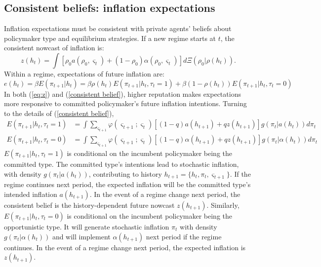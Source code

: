 \documentclass[12pt,letter,leqno]{article}
\theoremstyle{asn}
\theoremstyle{lem}
\theoremstyle{slem}
\theoremstyle{prop}
\theoremstyle{appprop}
\theoremstyle{rem}
\theoremstyle{defn}
\begin{document}
\subsection{Consistent beliefs: inflation expectations}
Inflation expectations must be consistent with private agents' beliefs about policymaker type and equilibrium strategies. If a new regime starts at $t$, the consistent nowcast of inflation is:
\begin{equation}\label{eq:z}
    z(h_t) =\int \left[ \rho_0 a(\rho_0,\varsigma_t) + (1-\rho_0) \alpha(\rho_0,\varsigma_t) \right]d\Xi(\rho_0|\rho(h_t)).
\end{equation}
Within a regime, expectations of future inflation are:
\begin{equation}
e(h_{t})=\beta E(\pi_{t+1}|h_t) =\beta \rho (h_{t})E(\pi _{t+1}|h_{t},\tau_{t}=1)+\beta (1-\rho
(h_{t}))E(\pi _{t+1}|h_{t},\tau_{t}=0)  \label{consistent belief}
\end{equation}
In both (\ref{eq:z}) and (\ref{consistent belief}), higher reputation makes expectations more responsive to committed policymaker's future inflation intentions. Turning to the details of (\ref{consistent belief}),
\begin{align}
\nonumber
E(\pi _{t+1}|h_{t},\tau_{t}=1)& =\int \sum_{\varsigma _{t+1}}\varphi
(\varsigma _{t+1};\varsigma _{t})\left[ \left( 1-q\right)
a(h_{t+1})+qz\left( h_{t+1}\right) \right] g(\pi _{t}|a(h_{t}))d\pi _{t} 
\nonumber \\
E(\pi _{t+1}|h_{t},\tau_{t}=0)& =\int \sum_{\varsigma _{t+1}}\varphi
(\varsigma _{t+1};\varsigma _{t})\left[ \left( 1-q\right) \alpha
(h_{t+1})+qz\left( h_{t+1}\right) \right] g(\pi _{t}|\alpha (h_{t}))d\pi _{t}
\nonumber
\end{align}
$E(\pi _{t+1}|h_{t},\tau_{t}=1)$ is conditional on the incumbent policymaker being the committed type. The committed type's intentions lead to stochastic inflation, with density $g(\pi_t|a(h_t))$, contributing to history $h_{t+1}=\{ h_t,\pi_t,\varsigma_{t+1} \}$. If the regime continues next period, the expected inflation will be the committed type's intended inflation $a(h_{t+1})$. In the event of a regime change next period, the consistent belief is the history-dependent future nowcast $z(h_{t+1})$. Similarly, $E(\pi _{t+1}|h_{t},\tau_{t}=0)$ is conditional on the incumbent policymaker being the opportunistic type. It will generate stochastic inflation $\pi_{t}$ with density $g(\pi_{t}|\alpha(h_{t}))$ and will implement $\alpha(h_{t+1})$ next period if the regime continues.
In the event of a regime change next period, the expected inflation is $z(h_{t+1})$.
\end{document}
